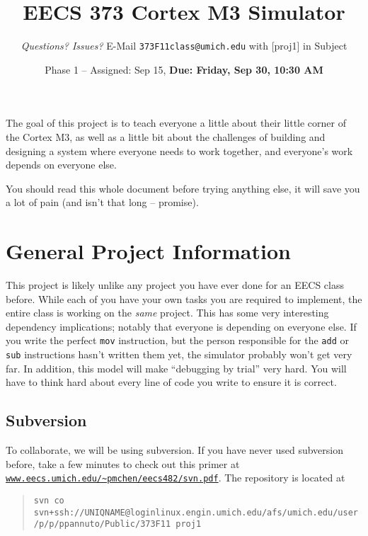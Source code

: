 \documentclass{article}
\begin{document}
\def\checkptdate{Friday, Sep 23, 10:30 AM}
\def\duedate{Friday, Sep 30, 10:30 AM}

\pagestyle{fancyplain}

\title{EECS 373 Cortex M3 Simulator}
\author{{\em Questions? Issues?} E-Mail {\tt 373F11class@umich.edu} with [proj1]
in Subject}
\date{Phase 1 -- Assigned: Sep 15, {\bf Due: \duedate}}
\maketitle

The goal of this project is to teach everyone a little about their little
corner of the Cortex M3, as well as a little bit about the challenges of
building and designing a system where everyone needs to work together, and
everyone's work depends on everyone else.

You should read this whole document before trying anything else, it will save
you a lot of pain (and isn't that long -- promise).

\section{General Project Information}

This project is likely unlike any project you have ever done for an EECS class
before. While each of you have your own tasks you are required to implement,
the entire class is working on the {\em same} project. This has some very
interesting dependency implications; notably that everyone is depending on
everyone else. If you write the perfect {\tt mov} instruction, but the person
responsible for the {\tt add} or {\tt sub} instructions hasn't written them
yet, the simulator probably won't get very far.
In addition, this model will make ``debugging by trial'' very hard. You will
have to think hard about every line of code you write to ensure it is correct.

\subsection{Subversion}

To collaborate, we will be using subversion. If you have never used subversion
before, take a few minutes to check out this primer at {\tt
\href{http://www.eecs.umich.edu/~pmchen/eecs482/svn.pdf}
{www.eecs.umich.edu/\textasciitilde pmchen/eecs482/svn.pdf}}. The repository is
located at

\begin{quote}
{\tt svn co
svn+ssh://UNIQNAME@loginlinux.engin.umich.edu/afs/umich.edu/user/p/p/ppannuto/Public/373F11~proj1}
\end{quote}
\end{document}
